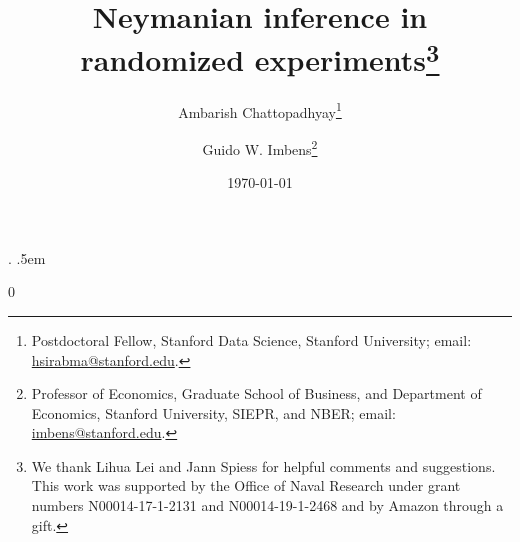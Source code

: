 \documentclass[12pt]{article}
\begin{document}
\pagestyle{plain}



{\topsep}%
{\topsep}%
{\it}%
{}%
{\bf}%
{.}%
{.5em}%
{}%
\theoremstyle{mystyle}
\newtheorem{assumptionex}{Assumption}
\newenvironment{assumption}
  {\pushQED{\qed}\renewcommand{\qedsymbol}{}\assumptionex}
  {\popQED\endassumptionex}
\newtheorem{assumptionexp}{Assumption}
\newenvironment{assumptionp}
  {\pushQED{\qed}\renewcommand{\qedsymbol}{}\assumptionexp}
  {\popQED\endassumptionexp}
\renewcommand{\theassumptionexp}{\arabic{assumptionexp}$'$}

\newtheorem{assumptionexpp}{Assumption}
\newenvironment{assumptionpp}
  {\pushQED{\qed}\renewcommand{\qedsymbol}{}\assumptionexpp}
  {\popQED\endassumptionexpp}
\renewcommand{\theassumptionexpp}{\arabic{assumptionexpp}$''$}

\newtheorem{assumptionexppp}{Assumption}
\newenvironment{assumptionppp}
  {\pushQED{\qed}\renewcommand{\qedsymbol}{}\assumptionexppp}
  {\popQED\endassumptionexppp}
\renewcommand{\theassumptionexppp}{\arabic{assumptionexppp}$'''$}

\renewcommand{\arraystretch}{1.3}



\newcommand{\argmin}{\mathop{\mathrm{argmin}}}
\makeatletter
\newcommand{\grande}{\bBigg@{2.25}}
\newcommand{\enorme}{\bBigg@{5}}

\newcommand{\blind}{0}

\newcommand{\tit}{Neymanian inference in randomized experiments}

\blind

{\title{\tit\thanks{We thank Lihua Lei and Jann Spiess for helpful comments and suggestions. This work was supported  by
the Office of Naval Research  under grant numbers N00014-17-1-2131 and N00014-19-1-2468 and by Amazon through a gift.
}}
\author{Ambarish Chattopadhyay\thanks{Postdoctoral Fellow, Stanford Data Science, Stanford University; email: \url{hsirabma@stanford.edu}.} \and Guido W. Imbens\thanks{Professor of Economics, Graduate School of Business, and Department of Economics, Stanford
University, SIEPR, and NBER; email: \url{imbens@stanford.edu}.}
}

\date{\today} 

\maketitle
}\fi
\end{document}
